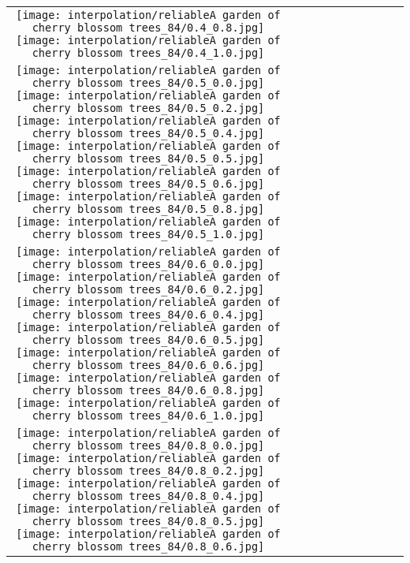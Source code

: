 \documentclass[10pt,twocolumn,letterpaper]{article}
\begin{document}
\begin{figure*}[tb!]
{\begin{tabular}{c c c c c c c c c c}
  \texttt{[image: interpolation/reliableA garden of cherry blossom trees\_84/0.4\_0.8.jpg]}
  \texttt{[image: interpolation/reliableA garden of cherry blossom trees\_84/0.4\_1.0.jpg]}
\tabularnewline
    \raisebox{0.1in}{\rotatebox{90}{\small \emph{$0.5$}
 }}
  \texttt{[image: interpolation/reliableA garden of cherry blossom trees\_84/0.5\_0.0.jpg]}
  \texttt{[image: interpolation/reliableA garden of cherry blossom trees\_84/0.5\_0.2.jpg]}
  \texttt{[image: interpolation/reliableA garden of cherry blossom trees\_84/0.5\_0.4.jpg]}
  \texttt{[image: interpolation/reliableA garden of cherry blossom trees\_84/0.5\_0.5.jpg]}
  \texttt{[image: interpolation/reliableA garden of cherry blossom trees\_84/0.5\_0.6.jpg]}
  \texttt{[image: interpolation/reliableA garden of cherry blossom trees\_84/0.5\_0.8.jpg]}
  \texttt{[image: interpolation/reliableA garden of cherry blossom trees\_84/0.5\_1.0.jpg]}
\tabularnewline
    \raisebox{0.1in}{\rotatebox{90}{\small \emph{$0.6$}
 }}
  \texttt{[image: interpolation/reliableA garden of cherry blossom trees\_84/0.6\_0.0.jpg]}
  \texttt{[image: interpolation/reliableA garden of cherry blossom trees\_84/0.6\_0.2.jpg]}
  \texttt{[image: interpolation/reliableA garden of cherry blossom trees\_84/0.6\_0.4.jpg]}
  \texttt{[image: interpolation/reliableA garden of cherry blossom trees\_84/0.6\_0.5.jpg]}
  \texttt{[image: interpolation/reliableA garden of cherry blossom trees\_84/0.6\_0.6.jpg]}
  \texttt{[image: interpolation/reliableA garden of cherry blossom trees\_84/0.6\_0.8.jpg]}
  \texttt{[image: interpolation/reliableA garden of cherry blossom trees\_84/0.6\_1.0.jpg]}
\tabularnewline
    \raisebox{0.1in}{\rotatebox{90}{\small \emph{$0.8$}
 }}
  \texttt{[image: interpolation/reliableA garden of cherry blossom trees\_84/0.8\_0.0.jpg]}
  \texttt{[image: interpolation/reliableA garden of cherry blossom trees\_84/0.8\_0.2.jpg]}
   \texttt{[image: interpolation/reliableA garden of cherry blossom trees\_84/0.8\_0.4.jpg]}
  \texttt{[image: interpolation/reliableA garden of cherry blossom trees\_84/0.8\_0.5.jpg]}
  \texttt{[image: interpolation/reliableA garden of cherry blossom trees\_84/0.8\_0.6.jpg]}

\end{tabular}}
\end{figure*}
\end{document}
